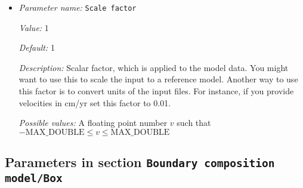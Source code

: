 \begin{itemize}
{\it Possible values:} An integer $n$ such that $-2147483648\leq n \leq 2147483647$
\item {\it Parameter name:} {\tt Scale factor}
\label{parameters:Boundary composition model/Ascii data model/Scale factor}


{\it Value:} 1


{\it Default:} 1


{\it Description:} Scalar factor, which is applied to the model data. You might want to use this to scale the input to a reference model. Another way to use this factor is to convert units of the input files. For instance, if you provide velocities in cm/yr set this factor to 0.01.


{\it Possible values:} A floating point number $v$ such that $-\text{MAX\_DOUBLE} \leq v \leq \text{MAX\_DOUBLE}$
\end{itemize}

\subsection{Parameters in section \tt Boundary composition model/Box}
\label{parameters:Boundary_20composition_20model/Box}

